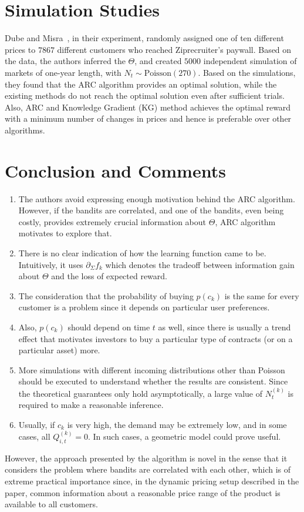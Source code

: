 \documentclass[11pt]{article}
\begin{document}
\section{Simulation Studies}

Dube and Misra~\cite{dube2017scalable}, in their experiment, randomly assigned one of ten different prices to $7867$ different customers who reached Ziprecruiter's paywall. Based on the data, the authors inferred the $\Theta$, and created $5000$ independent simulation of markets of one-year length, with $N_t \sim \text{Poisson}(270)$. Based on the simulations, they found that the ARC algorithm provides an optimal solution, while the existing methods do not reach the optimal solution even after sufficient trials. Also, ARC and Knowledge Gradient (KG) method achieves the optimal reward with a minimum number of changes in prices and hence is preferable over other algorithms.

\section{Conclusion and Comments}

\begin{enumerate}
    \item The authors avoid expressing enough motivation behind the ARC algorithm. However, if the bandits are correlated, and one of the bandits, even being costly, provides extremely crucial information about $\Theta$, ARC algorithm motivates to explore that.
    \item There is no clear indication of how the learning function came to be. Intuitively, it uses $\partial_\Sigma f_k$ which denotes the tradeoff between information gain about $\Theta$ and the loss of expected reward.
    \item The consideration that the probability of buying $p(c_k)$ is the same for every customer is a problem since it depends on particular user preferences.
    \item Also, $p(c_k)$ should depend on time $t$ as well, since there is usually a trend effect that motivates investors to buy a particular type of contracts (or on a particular asset) more.
    \item More simulations with different incoming distributions other than Poisson should be executed to understand whether the results are consistent. Since the theoretical guarantees only hold asymptotically, a large value of $N_t^{(k)}$ is required to make a reasonable inference.
    \item Usually, if $c_k$ is very high, the demand may be extremely low, and in some cases, all $Q_{i,t}^{(k)} = 0$. In such cases, a geometric model could prove useful.
\end{enumerate}

However, the approach presented by the algorithm is novel in the sense that it considers the problem where bandits are correlated with each other, which is of extreme practical importance since, in the dynamic pricing setup described in the paper, common information about a reasonable price range of the product is available to all customers.




\end{document}
